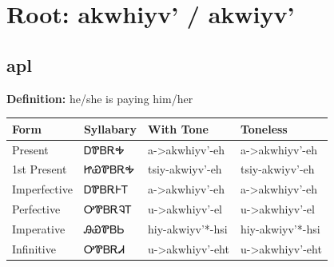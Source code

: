 \documentclass{article}%
\begin{document}
%
\normalsize%
\section*{Root: akwhiyv' / akwiyv'}%
\subsection*{apl}%
\textbf{Definition: }%
he/she is paying him/her%
\\[0.5em]%
\begin{tabular}{|l|l|l|l|}%
\hline%
\textbf{Form}&\textbf{Syllabary}&\textbf{With Tone}&\textbf{Toneless}\\%
\hline%
Present&ᎠᏈᏴᎡᎭ&a{-}>akwhiyv'{-}eh&a{-}>akwhiyv'{-}eh\\%
1st Present&ᏥᏯᏈᏴᎡᎭ&tsiy{-}akwiyv'{-}eh&tsiy{-}akwiyv'{-}eh\\%
Imperfective&ᎠᏈᏴᎡᎰᎢ&a{-}>akwhiyv'{-}eh&a{-}>akwhiyv'{-}eh\\%
Perfective&ᎤᏈᏴᎡᎸᎢ&u{-}>akwhiyv'{-}el&u{-}>akwhiyv'{-}el\\%
Imperative&ᎯᏯᏈᏴᏏ&hiy{-}akwiyv'*{-}hsi&hiy{-}akwiyv'*{-}hsi\\%
Infinitive&ᎤᏈᏴᎡᏗ&u{-}>akwhiyv'{-}eht&u{-}>akwhiyv'{-}eht\\%
\hline%
\end{tabular}%
\\[1em]%
\end{document}

